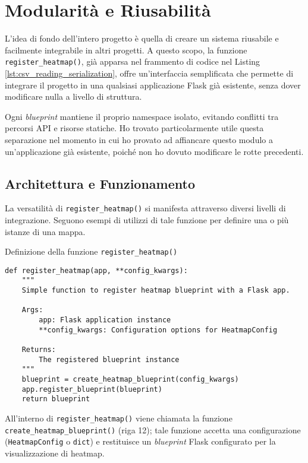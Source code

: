 \section{Modularità e Riusabilità}

L'idea di fondo dell'intero progetto è quella di creare un sistema riusabile e facilmente integrabile in altri progetti. A questo scopo, la funzione \texttt{register\_heatmap()}, già apparsa nel frammento di codice nel Listing \ref{lst:csv_reading_serialization}, offre un'interfaccia semplificata che permette di integrare il progetto in una qualsiasi applicazione Flask già esistente, senza dover modificare nulla a livello di struttura.

Ogni \textit{blueprint} mantiene il proprio namespace isolato, evitando conflitti tra percorsi API e risorse statiche. Ho trovato particolarmente utile questa separazione nel momento in cui ho provato ad affiancare questo modulo a un'applicazione già esistente, poiché non ho dovuto modificare le rotte precedenti.

\subsection{Architettura e Funzionamento}

La versatilità di \texttt{register\_heatmap()} si manifesta attraverso diversi livelli di integrazione.
Seguono esempi di utilizzi di tale funzione per definire una o più istanze di una mappa.

\begin{listing}[H]
\caption{Definizione della funzione \texttt{register\_heatmap()}}
\label{lst:register_heatmap_def}
\begin{verbatim}
def register_heatmap(app, **config_kwargs):
    """
    Simple function to register heatmap blueprint with a Flask app.
    
    Args:
        app: Flask application instance
        **config_kwargs: Configuration options for HeatmapConfig
    
    Returns:
        The registered blueprint instance
    """
    blueprint = create_heatmap_blueprint(config_kwargs)
    app.register_blueprint(blueprint)
    return blueprint
\end{verbatim}
\end{listing}

All'interno di \texttt{register\_heatmap()} viene chiamata la funzione \texttt{create\_heatmap\_blueprint()} (riga 12); tale funzione accetta una configurazione (\texttt{HeatmapConfig} o \texttt{dict}) e restituisce un \textit{blueprint} Flask configurato per la visualizzazione di heatmap.

